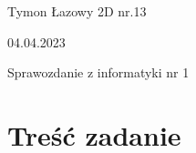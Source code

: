 \documentclass[a4paper,11pt]{article}
\begin{document}
\begin{center}
    \begin{multicols}{2}
    \begin{flushleft}
    \large{Tymon Łazowy 2D nr.13} \\
    \end{flushleft}
    
    \begin{flushright}
    \large{04.04.2023}\\
    \end{flushright}
    \end{multicols}
    {\LARGE Sprawozdanie z informatyki nr 1} \\ \vspace{0pt}
\end{center}

\section{Treść zadanie}
\end{document}
